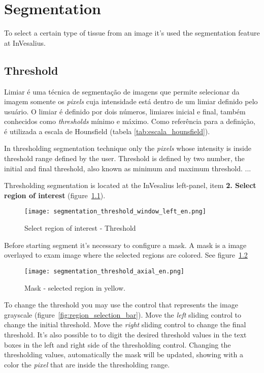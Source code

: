 \chapter{Segmentation}

To select a certain type of tissue from an image it's used the segmentation feature at InVesalius.

\section{Threshold}

Limiar é uma técnica de segmentação de imagens que permite selecionar da imagem somente os \textit{pixels} cuja intensidade está dentro de um limiar definido pelo usuário.  O limiar é definido por dois números, limiares inicial e final, também conhecidos como \textit{thresholds} mínimo e máximo. Como referência para a definição, é utilizada a escala de Hounsfield (tabela \ref{tab:escala_hounsfield}).

In thresholding segmentation technique only the \textit{pixels} whose intensity is inside threshold range defined by the user. Threshold is defined by two number, the initial and final threshold, also known as minimum and maximum threshold. ...

Thresholding segmentation is located at the InVesalius left-panel, item \textbf{2. Select region of interest} (figure~\ref{fig:region_selection}).

\begin{figure}[!htb]
\centering
\texttt{[image: segmentation\_threshold\_window\_left\_en.png]}
\caption{Select region of interest - Threshold}
\label{fig:region_selection}
\end{figure}

Before starting segment it's necessary to configure a mask. A mask is a image overlayed to exam image where the selected regions are colored. See figure~\ref{fig:region_selection_masc}

\begin{figure}[!htb]
\centering
\texttt{[image: segmentation\_threshold\_axial\_en.png]}
\caption{Mask - selected region in yellow.}
\label{fig:region_selection_masc}
\end{figure}

To change the threshold you may use the control that represents the image grayscale (figure~\ref{fig:region_selection_bar}). Move the \textit{left} sliding control to change the initial threshold. Move the \textit{right} sliding control to change the final threshold. It's also possible to to digit the desired threshold values in the text boxes in the left and right side of the thresholding control. Changing the thresholding values, automatically the mask will be updated, showing with a color the \textit{pixel} that are inside the thresholding range.


